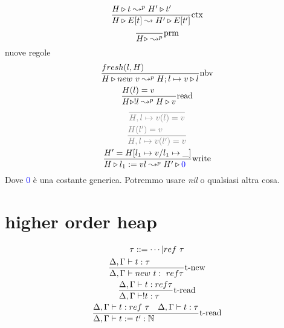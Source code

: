 \documentclass{article}
\begin{document}
\begin{gather*}
    \st[ctx]{
        H\triangleright E[t]\leadsto H'\triangleright E[t']
    }{
        H\triangleright t \leadsto^p H'\triangleright t'
    }
    \\
    \st[prm]{
        H\triangleright \leadsto^p 
    }{
    }
\end{gather*}
nuove regole 
\begin{gather*}
    \st[nbv]{
        H\triangleright new\ v \leadsto^p H;l\mapsto v \triangleright l
    }{
        fresh(l,H)
    }
    \\
    \st[read]{
        H\triangleright !l \leadsto^p H\triangleright v
    }{
        H(l)=v
    }
    \\
    \textcolor{gray}{
        \st[]{
            H,l\mapsto v(l) = v
        }{}
    }\\
    \textcolor{gray}{
        \st[]{
            H,l\mapsto v(l') = v
        }{
            H(l') = v
        }
    }
    \\
    \st[write]{
        H\triangleright l_1:= v l\leadsto^p H'\triangleright \textcolor{blue}{0}
    }{
        H'=H[l_1\mapsto v / l_1\mapsto\_]
    }
\end{gather*}
Dove \textcolor{blue}{0} è una costante generica. Potremmo usare \textit{nil} o qualsiasi altra cosa.

\section{higher order heap}
\begin{gather*}
    \tau ::= \cdots | ref\ \tau \\
    \st[t-new]{
        \Delta,\Gamma\vdash new\ t:\ ref \tau
    }{
        \Delta,\Gamma\vdash t:\tau
    } \\
    \st[t-read]{
        \Delta,\Gamma\vdash !t: \tau
    }{
        \Delta,\Gamma\vdash t:ref \tau
    } \\
    \st[t-read]{
        \Delta,\Gamma\vdash t:=t':\N
    }{
        \Delta,\Gamma\vdash t:ref\ \tau \quad \Delta,\Gamma\vdash t:\tau
    }
\end{gather*}
\end{document}
